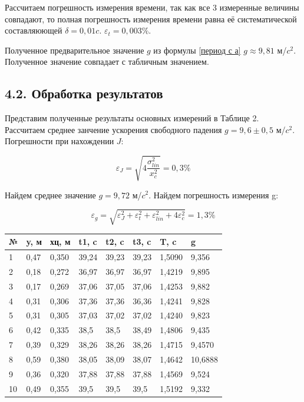     Рассчитаем погрешность измерения времени, так как все 3 измеренные величины совпадают, то полная погрешность измерения времени равна её систематической составляюющей $\delta = 0,01 c$. $\varepsilon_t = 0,003\%$.

    Полученное предварительное значение $g$ из формулы \eqref{период с а} $g \approx 9,81$ м/$c^2$. Полученное значение совпадает с табличным значением.\\


\subsection*{4.2. Обработка результатов}

    Представим полученные результаты основных измерений в Таблице 2. 
    Рассчитаем среднее занчение ускорения свободного падения $g = 9,6 \pm 0,5$ м/$c^2$.
    Погрешности при нахождении $J$:

\[\varepsilon_{J} = \sqrt{4 \frac{\sigma_{lin}^2}{x_{c}^2}} = 0,3\%\]

    Найдем среднее значение $g = 9,72$ м/$c^2$.
    Найдем погрешность измерения g:
    
    \[\varepsilon_{g} = \sqrt{\varepsilon_{J}^2 + \varepsilon_{t}^2 + \varepsilon_{lin}^2 + 4\varepsilon_{c}^2} = 1,3\%\]
    
    
\begin{table}[H]
\centering
\begin{tabular}{|l|l|l|l|l|l|l|l|}
\hline
№  & y, м & хц, м & t1, c & t2, c & t3, c & T, c   & g \\ \hline
1  & 0,47 & 0,350 & 39,24 & 39,23 & 39,23 & 1,5090 & 9,356     \\ \hline
2  & 0,18 & 0,272 & 36,97 & 36,97 & 36,97 & 1,4219 & 9,895     \\ \hline
3  & 0,17 & 0,269 & 37,06 & 37,05 & 37,06 & 1,4253 & 9,882     \\ \hline
4  & 0,31 & 0,306 & 37,36 & 37,36 & 36,36 & 1,4241 & 9,828     \\ \hline
5  & 0,31 & 0,305 & 37,03 & 37,02 & 37,02 & 1,4240 & 9,823     \\ \hline
6  & 0,42 & 0,335 & 38,5  & 38,5  & 38,49 & 1,4806 & 9,435     \\ \hline
7  & 0,39 & 0,329 & 38,26 & 38,26 & 38,26 & 1,4715 & 9,4570    \\ \hline
8  & 0,59 & 0,380 & 38,05 & 38,09 & 38,07 & 1,4642 & 10,6888   \\ \hline
9  & 0,36 & 0,320 & 37,88 & 37,88 & 37,88 & 1,4569 & 9,524     \\ \hline
10 & 0,49 & 0,355 & 39,5  & 39,5  & 39,5  & 1,5192 & 9,332     \\ \hline
\end{tabular}
\end{table}

